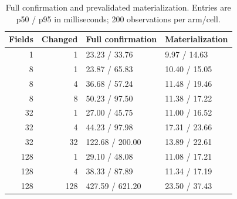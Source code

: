 \begin{table}[htbp]
\centering\small
\caption{Full confirmation and prevalidated materialization. Entries are p50 / p95 in milliseconds; 200 observations per arm/cell.}
\label{tab:s-ablation-grid}
\begin{tabular}{@{}rrll@{}}
\toprule
Fields & Changed & Full confirmation & Materialization \\
\midrule
1 & 1 & 23.23 / 33.76 & 9.97 / 14.63 \\
8 & 1 & 23.87 / 65.83 & 10.40 / 15.05 \\
8 & 4 & 36.68 / 57.24 & 11.48 / 19.46 \\
8 & 8 & 50.23 / 97.50 & 11.38 / 17.22 \\
32 & 1 & 27.00 / 45.75 & 11.00 / 16.52 \\
32 & 4 & 44.23 / 97.98 & 17.31 / 23.66 \\
32 & 32 & 122.68 / 200.00 & 13.89 / 22.61 \\
128 & 1 & 29.10 / 48.08 & 11.08 / 17.21 \\
128 & 4 & 38.33 / 87.89 & 11.34 / 17.19 \\
128 & 128 & 427.59 / 621.20 & 23.50 / 37.43 \\
\bottomrule\end{tabular}\end{table}
